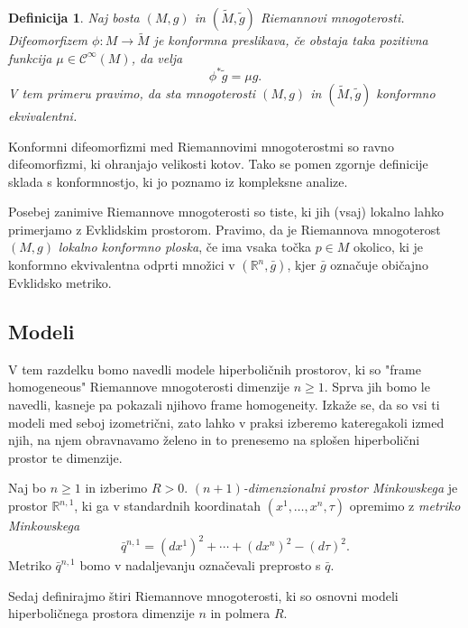 \documentclass[a4paper]{article}
\newtheorem{definicija}{Definicija}
\begin{document}
\begin{definicija}
Naj bosta $(M,g)$ in $(\tilde{M}, \tilde{g})$ Riemannovi mnogoterosti. Difeomorfizem $\phi \colon M \to \tilde{M}$ je \emph{konformna preslikava}, če obstaja taka pozitivna funkcija $\mu \in \mathcal{C}^{\infty}(M)$, da velja
\[ \phi^{*}\tilde{g} = \mu g. \]
V tem primeru pravimo, da sta mnogoterosti $(M,g)$ in $(\tilde{M}, \tilde{g})$ \emph{konformno ekvivalentni}.
\end{definicija}

Konformni difeomorfizmi med Riemannovimi mnogoterostmi so ravno difeomorfizmi, ki ohranjajo velikosti kotov. Tako se pomen zgornje definicije sklada s konformnostjo, ki jo poznamo iz kompleksne analize.

Posebej zanimive Riemannove mnogoterosti so tiste, ki jih (vsaj) lokalno lahko primerjamo z Evklidskim prostorom. Pravimo, da je Riemannova mnogoterost $(M,g)$ \emph{lokalno konformno ploska}, če ima vsaka točka $p\in M$ okolico, ki je konformno ekvivalentna odprti množici v $(\mathbb{R}^{n}, \bar{g})$, kjer $\bar{g}$ označuje običajno Evklidsko metriko.

\subsection{Modeli}

V tem razdelku bomo navedli modele hiperboličnih prostorov, ki so "frame homogeneous" Riemannove mnogoterosti dimenzije $n \geq 1$. Sprva jih bomo le navedli, kasneje pa pokazali njihovo frame homogeneity. Izkaže se, da so vsi ti modeli med seboj izometrični, zato lahko v praksi izberemo kateregakoli izmed njih, na njem obravnavamo želeno in to prenesemo na splošen hiperbolični prostor te dimenzije.

Naj bo $n \geq 1$ in izberimo $R>0$.
\emph{$(n+1)$-dimenzionalni prostor Minkowskega} je prostor $\mathbb{R}^{n,1}$, ki ga v standardnih koordinatah $(x^{1}, \dots , x^{n}, \tau)$ opremimo z \emph{metriko Minkowskega}
\begin{equation}\label{eq:Mink metrika}
\bar{q}^{n,1} = (dx^{1})^2 + \cdots + (dx^{n})^2 - (d\tau)^2.
\end{equation}
Metriko $\bar{q}^{n,1}$ bomo v nadaljevanju označevali preprosto s $\bar{q}$.

Sedaj definirajmo štiri Riemannove mnogoterosti, ki so osnovni modeli hiperboličnega prostora dimenzije $n$ in polmera $R$.
\end{document}
